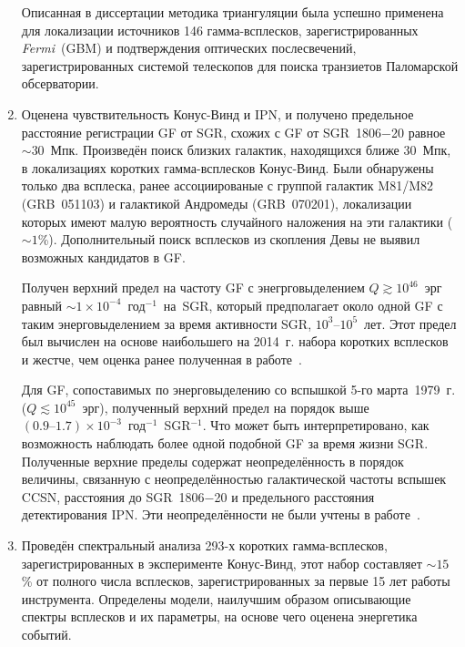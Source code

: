 \begin{enumerate}
    Описанная в диссертации методика триангуляции была успешно применена для 
    локализации источников 146 гамма-всплесков, зарегистрированных \textit{Fermi}~(GBM) и
    подтверждения оптических послесвечений, зарегистрированных системой телескопов 
    для поиска транзиетов Паломарской обсерватории.
    
\item Оценена чувствительность Конус-Винд и IPN, и получено 
    предельное расстояние регистрации GF от SGR, схожих с GF от SGR~1806$-$20 
    равное $\sim 30$~Мпк. 
    Произведён поиск близких галактик, находящихся ближе 30~Мпк, в локализациях 
    коротких гамма-всплесков Конус-Винд. Были обнаружены только два всплеска, ранее 
    ассоциированые с группой галактик M81/M82 (GRB~051103) и галактикой Андромеды (GRB~070201),
    локализации которых имеют малую вероятность случайного наложения на эти галактики ($\sim 1$\%).
    Дополнительный поиск всплесков из скопления Девы не выявил возможных кандидатов в GF.
    
    Получен верхний предел на частоту GF с энегрговыделением $Q \gtrsim 10^{46}$~эрг равный
    $\sim 1 \times 10^{-4}$~год$^{-1}$~на~SGR, который предполагает 
    около одной GF с таким энерговыделением за время активности SGR, $10^3\textrm{--}10^5$~лет. 
    Этот предел был вычислен на основе наибольшего на 2014~г.  
    набора коротких всплесков и жестче, чем оценка ранее полученная в работе~\citep{Ofek_2007ApJ}.
    
    Для GF, сопоставимых по энерговыделению со вспышкой 5-го марта~1979~г. ($Q \lesssim 10^{45}$~эрг), 
    полученный верхний предел на порядок выше $(0.9\textrm{--}1.7)\times 10^{-3}$~год$^{-1}$~SGR$^{-1}$. 
    Что может быть интерпретировано, как возможность наблюдать более одной подобной GF за время жизни SGR.
    Полученные верхние пределы содержат неопределённость в порядок величины, связанную с
    неопределённостью галактической частоты вспышек CCSN, расстояния до SGR~1806$-$20 и
    предельного расстояния детектирования IPN. Эти неопределённости не были учтены в работе~\citep{Ofek_2007ApJ}.
  
\item Проведён спектральный анализа 293-х коротких гамма-всплесков,
    зарегистрированных в эксперименте Конус-Винд, этот набор составляет $\sim 15$\% 
    от полного числа всплесков, зарегистрированных за первые 15 лет работы инструмента.
    Определены модели, наилучшим образом описывающие спектры всплесков и их параметры,
    на основе чего оценена энергетика событий. 
    

\end{enumerate}
